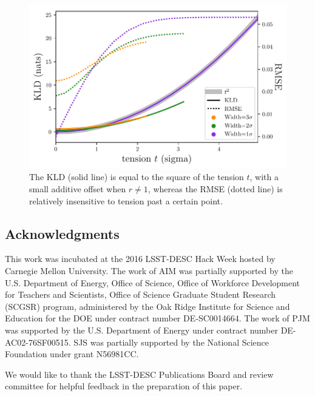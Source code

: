 \documentclass[\docopts]{\docclass}
\begin{document}
\begin{figure}
  \begin{center}
    \includegraphics[width=\columnwidth]{figures/tension.pdf}
    \caption{The KLD (solid line) is equal to the square of the tension $t$, 
with a small additive offset when $r\neq1$, whereas the RMSE (dotted line) is 
relatively insensitive to tension past a certain point.
    \label{fig:tension}}
  \end{center}
\end{figure}

\subsection*{Acknowledgments}


This work was incubated at the 2016 LSST-DESC Hack Week hosted by Carnegie 
Mellon University.
The work of AIM was partially supported by the U.S. Department of Energy, 
Office of Science, Office of Workforce Development for Teachers and Scientists, 
Office of Science Graduate Student Research (SCGSR) program, administered by 
the Oak Ridge Institute for Science and Education for the DOE under contract 
number DE‐SC0014664.
The work of PJM was supported by the U.S. Department of Energy under contract 
number DE-AC02-76SF00515.
SJS was partially supported by the National Science Foundation under grant 
N56981CC.


We would like to thank the LSST-DESC Publications Board and review committee 
for helpful feedback in the preparation of this paper.





\end{document}
